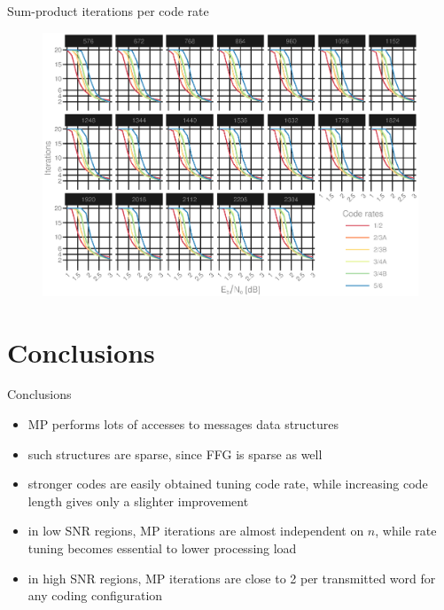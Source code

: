 \documentclass{beamer}
\begin{document}
\begin{darkframes}
  \begin{frame}{Sum-product iterations per code rate}
    \begin{figure}[h]
      \centering
      \vspace{-2mm}%
      \hspace{-6mm}%
      \includegraphics[width=1.05\textwidth]{figures/iters_vs_SNR_per_rate.eps}
    \end{figure}
  \end{frame}

  \section{Conclusions}
  \begin{frame}{Conclusions}
    \begin{itemize}
      \item MP performs lots of accesses to messages data structures
      \item such structures are sparse, since FFG is sparse as well
    \end{itemize}

    \begin{itemize}
      \item stronger codes are easily obtained tuning code rate, while increasing code length gives only a slighter improvement

      \item in low SNR regions, MP iterations are almost independent on $n$, while rate tuning becomes essential to lower processing load

      \item in high SNR regions, MP iterations are close to 2 per transmitted word for any coding configuration
    \end{itemize}
  \end{frame}
\end{darkframes}
\end{document}
